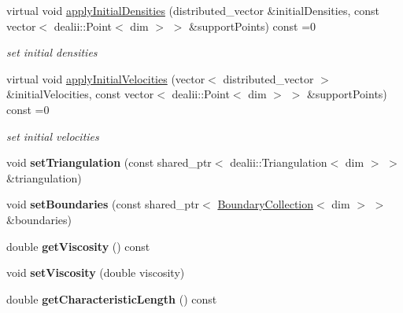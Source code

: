 \begin{DoxyCompactItemize}
\item 
virtual void \hyperlink{classnatrium_1_1ProblemDescription_a2f3da77af3942e626677cbdb04d683a9}{apply\-Initial\-Densities} (distributed\-\_\-vector \&initial\-Densities, const vector$<$ dealii\-::\-Point$<$ dim $>$ $>$ \&support\-Points) const =0
\begin{DoxyCompactList}\small\item\em set initial densities \end{DoxyCompactList}\item 
virtual void \hyperlink{classnatrium_1_1ProblemDescription_a545b19d87ec6dc9c27e8740097f7cace}{apply\-Initial\-Velocities} (vector$<$ distributed\-\_\-vector $>$ \&initial\-Velocities, const vector$<$ dealii\-::\-Point$<$ dim $>$ $>$ \&support\-Points) const =0
\begin{DoxyCompactList}\small\item\em set initial velocities \end{DoxyCompactList}\item 
\hypertarget{classnatrium_1_1ProblemDescription_ae588b1e0ce4dd89e2fcfbb0c191b1c41}{void {\bfseries set\-Triangulation} (const shared\-\_\-ptr$<$ dealii\-::\-Triangulation$<$ dim $>$ $>$ \&triangulation)}\label{classnatrium_1_1ProblemDescription_ae588b1e0ce4dd89e2fcfbb0c191b1c41}

\item 
\hypertarget{classnatrium_1_1ProblemDescription_aadca2aac3953fa44bf9ce9cf43dc0417}{void {\bfseries set\-Boundaries} (const shared\-\_\-ptr$<$ \hyperlink{classnatrium_1_1BoundaryCollection}{Boundary\-Collection}$<$ dim $>$ $>$ \&boundaries)}\label{classnatrium_1_1ProblemDescription_aadca2aac3953fa44bf9ce9cf43dc0417}

\item 
\hypertarget{classnatrium_1_1ProblemDescription_a582ecf296837d78a8a00fd598de38de2}{double {\bfseries get\-Viscosity} () const }\label{classnatrium_1_1ProblemDescription_a582ecf296837d78a8a00fd598de38de2}

\item 
\hypertarget{classnatrium_1_1ProblemDescription_ad624cab941ab79af0422e5f7c735e8d8}{void {\bfseries set\-Viscosity} (double viscosity)}\label{classnatrium_1_1ProblemDescription_ad624cab941ab79af0422e5f7c735e8d8}

\item 
\hypertarget{classnatrium_1_1ProblemDescription_ac424dbc36ad2d61d128f3656a8d6952d}{double {\bfseries get\-Characteristic\-Length} () const }\label{classnatrium_1_1ProblemDescription_ac424dbc36ad2d61d128f3656a8d6952d}


\end{DoxyCompactItemize}
